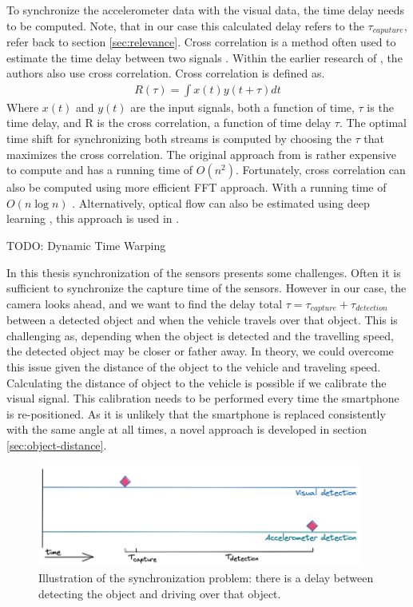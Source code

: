 To synchronize the accelerometer data with the visual data, the time delay needs to be computed. Note, that in our case this calculated delay refers to the $\tau_{caputure}$, refer back to section \ref{sec:relevance}. Cross correlation is a method often used to estimate the time delay between two signals \cite{Knapp1976}. Within the earlier research of \cite{Fridman2015, Zhang2020}, the authors also use cross correlation. Cross correlation is defined as.
\begin{align*}
R(\tau) = \int x(t) y(t + \tau) dt 
\end{align*}
Where $x(t)$ and $y(t)$ are the input signals, both a function of time, $\tau$ is the time delay, and R is the cross correlation, a function of time delay $\tau$. The optimal time shift for synchronizing both streams is computed by choosing the $\tau$ that maximizes the cross correlation. The original approach from \cite{Knapp1976} is rather expensive to compute and has a running time of $O(n^2)$. Fortunately, cross correlation can also be computed using more efficient FFT approach\cite{Lewis2001}. With a running time of $O(n \log n)$ \cite{Fridman2015}. Alternatively, optical flow can also be estimated using deep learning \cite{Deqing2017}, this approach is used in \cite{Zhang2020}.

TODO: Dynamic Time Warping

In this thesis synchronization of the sensors presents some challenges. Often it is sufficient to synchronize the capture time of the sensors. However in our case, the camera looks ahead, and we want to find the delay total $\tau = \tau_{capture} + \tau_{detection}$ between a detected object and when the vehicle travels over that object. This is challenging as, depending when the object is detected and the travelling speed, the detected object may be closer or father away. In theory, we could overcome this issue given the distance of the object to the vehicle and traveling speed. Calculating the distance of object to the vehicle is possible if we calibrate the visual signal. This calibration needs to be performed every time the smartphone is re-positioned. As it is unlikely that the smartphone is replaced consistently with the same angle at all times, a novel approach is developed in section \ref{sec:object-distance}.

\begin{figure}[ht]
\begin{center}
\includegraphics[width=0.95\textwidth,keepaspectratio]{images/2_literature/time-line-synchonization.png}
\end{center}
\captionsetup{width=0.95\textwidth}
\caption{Illustration of the synchronization problem: there is a delay between detecting the object and driving over that object.}
\end{figure}


